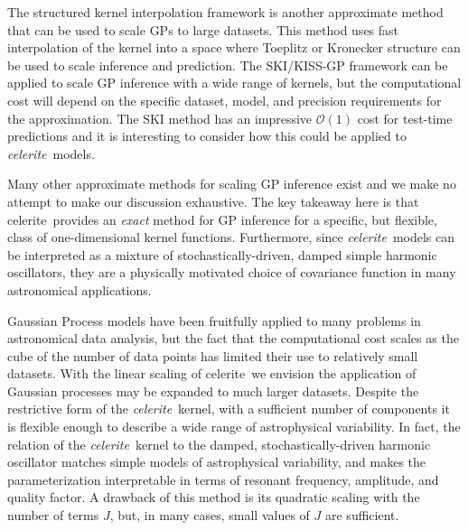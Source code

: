 \documentclass[manuscript, letterpaper]{aastex6}
\makeatletter
\let\origsection\section
\renewcommand\section{\@ifstar{\starsection}{\nostarsection}}
\newcommand\nostarsection[1]{\sectionprelude\origsection{#1}}
\newcommand\starsection[1]{\sectionprelude\origsection*{#1}}
\newcommand\sectionprelude{\vspace{1em}}
\newcommand{\project}[1]{\textsf{#1}}
\newcommand{\celerite}{\project{celerite}}
\newcommand{\celeriteterm}{\emph{celerite}}
\makeatother
\begin{document}
The structured kernel interpolation \citep[SKI/KISS-GP][]{Wilson:2015}
framework is another approximate method that can be used to scale GPs to large
datasets.
This method uses fast interpolation of the kernel into a space where Toeplitz
or Kronecker structure can be used to scale inference and prediction.
The SKI/KISS-GP framework can be applied to scale GP inference with a wide
range of kernels, but the computational cost will depend on the specific
dataset, model, and precision requirements for the approximation.
The SKI method has an impressive $\mathcal{O}(1)$ cost for test-time
predictions and it is interesting to consider how this could be applied to
\celeriteterm\ models.

Many other approximate methods for scaling GP inference exist \citep[see, for
example,][and references therein]{Wilson:2015a} and we make no attempt to make
our discussion exhaustive.
The key takeaway here is that \celerite\ provides an \emph{exact} method for
GP inference for a specific, but flexible, class of one-dimensional kernel
functions.
Furthermore, since \celeriteterm\ models can be interpreted as a mixture of
stochastically-driven, damped simple harmonic oscillators, they are a
physically motivated choice of covariance function in many astronomical applications.

\section{Summary}

Gaussian Process models have been fruitfully applied to many problems in
astronomical data analysis, but the fact that the computational cost scales as
the cube of the number of data points has limited their use to relatively
small datasets.
With the linear scaling of \celerite\, we envision the application of Gaussian
processes may be expanded to much larger datasets.
Despite the restrictive form of the \celeriteterm\ kernel, with a sufficient
number of components it is flexible enough to describe a wide range of
astrophysical variability.
In fact, the relation of the \celeriteterm\ kernel to the damped, stochastically-driven harmonic
oscillator matches simple models of astrophysical variability, and makes the
parameterization interpretable in terms of resonant frequency, amplitude, and
quality factor.
A drawback of this method is its quadratic scaling with the number of
terms $J$, but, in many cases, small values of $J$ are sufficient.
\end{document}
